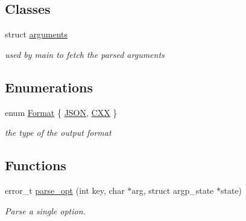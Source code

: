 \subsection*{Classes}
\begin{DoxyCompactItemize}
\item 
struct \hyperlink{structarguments}{arguments}
\begin{DoxyCompactList}\small\item\em used by main to fetch the parsed arguments \end{DoxyCompactList}\end{DoxyCompactItemize}
\subsection*{Enumerations}
\begin{DoxyCompactItemize}
\item 
enum \hyperlink{arg-info_8h_ab4e88c89b3b7ea1735996cc4def22d58}{Format} \{ \hyperlink{arg-info_8h_ab4e88c89b3b7ea1735996cc4def22d58aa5210511e3859748f136ab50c313ef05}{J\+S\+ON}, 
\hyperlink{arg-info_8h_ab4e88c89b3b7ea1735996cc4def22d58afde1c37e079bb0efad8943458c4c6da8}{C\+XX}
 \}\begin{DoxyCompactList}\small\item\em the type of the output format \end{DoxyCompactList}
\end{DoxyCompactItemize}
\subsection*{Functions}
\begin{DoxyCompactItemize}
\item 
error\+\_\+t \hyperlink{arg-info_8h_a5fb6abc38ef248ec154591e0dd392c1b}{parse\+\_\+opt} (int key, char $\ast$arg, struct argp\+\_\+state $\ast$state)
\begin{DoxyCompactList}\small\item\em Parse a single option. \end{DoxyCompactList}\end{DoxyCompactItemize}
